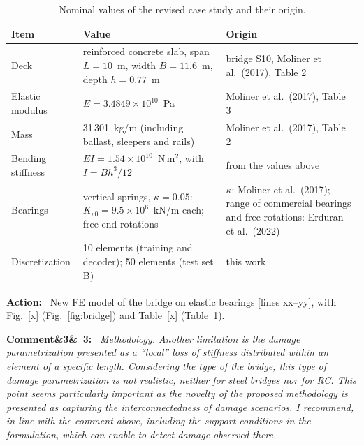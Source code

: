 \documentclass[11pt]{article}
\newenvironment{rcomment}[1]{\par\bigskip\noindent\textbf{Comment\ifx&#1&\else\ #1\fi:}\ \itshape}{\par}
\newenvironment{action}{\par\smallskip\noindent\color{resp}\textbf{Action:}\ }{\par}
\newcommand{\tbd}[1]{\textcolor{note}{\textsf{[#1]}}}
\newcommand{\lines}[1]{\tbd{lines #1}}
\begin{document}
\begin{table}[H]
\centering\small
\caption{Nominal values of the revised case study and their origin.}
\label{tab:specs}
\footnotesize
\begin{tabular}{p{3.0cm}p{6.6cm}p{5.0cm}}
\toprule
Item & Value & Origin \\
\midrule
Deck & reinforced concrete slab, span $L=10$~m, width $B=11.6$~m, depth $h=0.77$~m & bridge S10, Moliner et al.\ (2017), Table 2 \\
Elastic modulus & $E=3.4849\times10^{10}$~Pa & Moliner et al.\ (2017), Table 3 \\
Mass & 31\,301~kg/m (including ballast, sleepers and rails) & Moliner et al.\ (2017), Table 2 \\
Bending stiffness & $EI=1.54\times10^{10}$~N\,m$^2$, with $I=Bh^3/12$ & from the values above \\
Bearings & vertical springs, $\kappa=0.05$: $K_{v0}=9.5\times10^{6}$~kN/m each; free end rotations & $\kappa$: Moliner et al.\ (2017); range of
commercial bearings and free rotations: Erduran et al.\ (2022) \\
Discretization & 10 elements (training and decoder); 50 elements (test set B) & this work \\
\bottomrule
\end{tabular}
\end{table}

\begin{action}
New FE model of the bridge on elastic bearings \lines{xx--yy}, with Fig.~\tbd{x} (Fig.~\ref{fig:bridge}) and
Table~\tbd{x} (Table~\ref{tab:specs}).
\end{action}

\begin{rcomment}{3}
Methodology. Another limitation is the damage parametrization presented as a ``local'' loss of stiffness distributed within an element of a specific length. Considering the type of the bridge, this type of damage parametrization is not realistic, neither for steel bridges nor for RC. This point seems particularly important as the novelty of the proposed
methodology is presented as capturing the interconnectedness of damage scenarios. I recommend, in line with the comment above, including the support conditions in the formulation, which can enable to detect damage observed there.
\end{rcomment}
\end{document}
